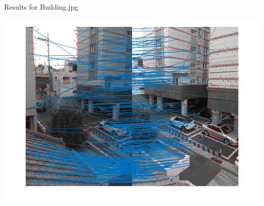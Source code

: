 \documentclass[fleqn]{article}
\begin{document}
Results for Building.jpg
\begin{center}
\includegraphics[width=1.2\textwidth]{building1.jpg}


\end{center}
\end{document}

